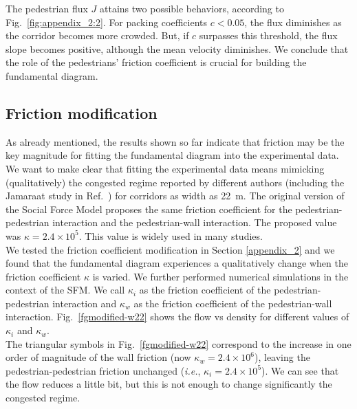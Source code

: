 \documentclass[preprint,12pt]{elsarticle}
\begin{document}
The pedestrian flux $J$ attains two possible behaviors, according to 
Fig.~\ref{fig:appendix_2:2}. For packing coefficients $c<0.05$, the flux 
diminishes as the corridor becomes more crowded. But, if $c$ surpasses this 
threshold, the flux slope becomes positive, although the mean velocity 
diminishes. We conclude that the role of the pedestrians' friction coefficient is crucial 
for building the fundamental diagram.   






\subsection{Friction modification}

As already mentioned, the results shown so far indicate that friction may be the 
key magnitude for fitting the fundamental diagram into the experimental data. We 
want to make clear that fitting the experimental data means mimicking 
(qualitatively) the congested regime reported by different authors (including 
the Jamaraat study in Ref.~\cite{helbing3}) for corridors as width as 22~m. The 
original version of the Social Force Model proposes the same 
friction coefficient for the pedestrian-pedestrian interaction and the 
pedestrian-wall interaction. The proposed value was $\kappa = 2.4\times10^{5}$. 
This value is widely used in many studies.  \\

We tested the friction coefficient modification in Section \ref{appendix_2} and we found that the fundamental diagram experiences a qualitatively change when the friction coefficient $\kappa$ is varied. We further performed numerical simulations in the context of the SFM. We call $\kappa_i$ as the friction coefficient of the pedestrian-pedestrian interaction and $\kappa_w$ as the friction coefficient of the pedestrian-wall interaction. Fig.~\ref{fgmodified-w22} shows the flow vs density for different values of $\kappa_i$ and $\kappa_w$.\\

The triangular symbols in Fig.~\ref{fgmodified-w22} correspond to the increase in one order of magnitude of the wall friction (now $\kappa_w = 2.4\times10^{6}$), leaving the pedestrian-pedestrian friction unchanged (\textit{i.e.}, $\kappa_i = 2.4\times10^{5}$). We can see that the flow reduces a little bit, but this is not enough to change significantly the congested regime. \\
\end{document}
